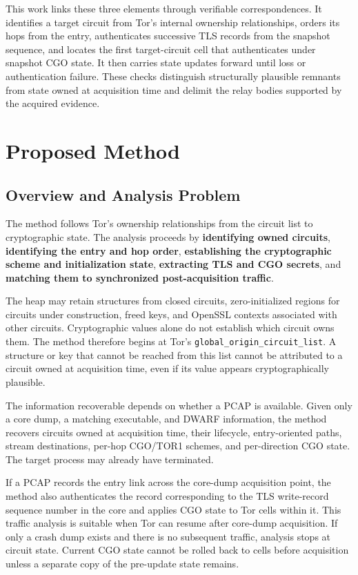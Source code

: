 \documentclass[10pt,a4paper]{article}
\newcommand{\code}[1]{\nolinkurl{#1}}
\newcommand{\torone}{\textsc{TOR1}}
\begin{document}
This work links these three elements through verifiable correspondences. It identifies a target circuit from Tor's internal ownership relationships, orders its hops from the entry, authenticates successive TLS records from the snapshot sequence, and locates the first target-circuit cell that authenticates under snapshot CGO state. It then carries state updates forward until loss or authentication failure. These checks distinguish structurally plausible remnants from state owned at acquisition time and delimit the relay bodies supported by the acquired evidence.

\section{Proposed Method}\label{sec:method}

\subsection{Overview and Analysis Problem}

The method follows Tor's ownership relationships from the circuit list to cryptographic state. The analysis proceeds by \textbf{identifying owned circuits}, \textbf{identifying the entry and hop order}, \textbf{establishing the cryptographic scheme and initialization state}, \textbf{extracting TLS and CGO secrets}, and \textbf{matching them to synchronized post-acquisition traffic}.

The heap may retain structures from closed circuits, zero-initialized regions for circuits under construction, freed keys, and OpenSSL contexts associated with other circuits. Cryptographic values alone do not establish which circuit owns them. The method therefore begins at Tor's \code{global_origin_circuit_list}. A structure or key that cannot be reached from this list cannot be attributed to a circuit owned at acquisition time, even if its value appears cryptographically plausible.

The information recoverable depends on whether a PCAP is available. Given only a core dump, a matching executable, and DWARF information, the method recovers circuits owned at acquisition time, their lifecycle, entry-oriented paths, stream destinations, per-hop CGO/\torone{} schemes, and per-direction CGO state. The target process may already have terminated.

If a PCAP records the entry link across the core-dump acquisition point, the method also authenticates the record corresponding to the TLS write-record sequence number in the core and applies CGO state to Tor cells within it. This traffic analysis is suitable when Tor can resume after core-dump acquisition. If only a crash dump exists and there is no subsequent traffic, analysis stops at circuit state. Current CGO state cannot be rolled back to cells before acquisition unless a separate copy of the pre-update state remains.
\end{document}
